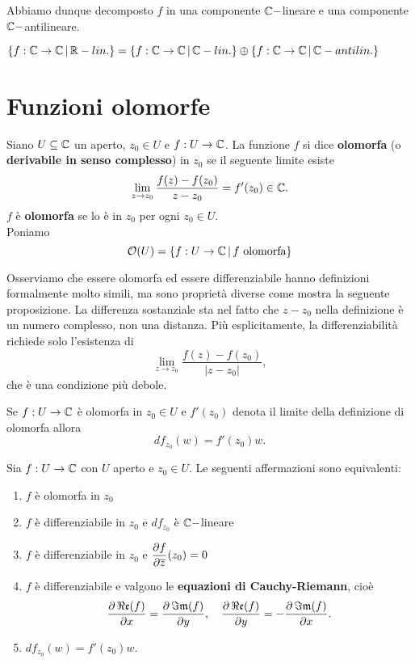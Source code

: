 \begin{multicols*}{2}
Abbiamo dunque decomposto $f$ in una componente $\C-$lineare e una componente $\C-$antilineare. \\
\begin{proposition}\label{RlinSonoSommaDirettaClinECantilin}

\footnotesize{$\cpa{f:\C\to \C\sep \R-lin.}=\cpa{f:\C\to \C\sep \C-lin.}\oplus\cpa{f:\C\to \C\sep \C-antilin.}$}
\end{proposition}

\section{Funzioni olomorfe}
\begin{definition}
Siano $U\subseteq \C$ un aperto, $z_0\in U$ e $f:U\to \C$. La funzione $f$ si dice \textbf{olomorfa} (o \textbf{derivabile in senso complesso}) in $z_0$ se il seguente limite esiste
\[\lim_{z\to z_0}\frac{f(z)-f(z_0)}{z-z_0}=f'(z_0)\in\C.\]
$f$ \`e \textbf{olomorfa} se lo \`e in $z_0$ per ogni $z_0\in U$.\\
Poniamo
\[\Oc(U)=\cpa{f:U\to\C\sep f\text{ olomorfa}}\]
\end{definition}
\noindent
Osserviamo che essere olomorfa ed essere differenziabile hanno definizioni formalmente molto simili, ma sono propriet\`a diverse come mostra la seguente proposizione. La differenza sostanziale sta nel fatto che $z-z_0$ nella definizione \`e un numero complesso, non una distanza. Pi\`u esplicitamente, la differenziabilit\`a richiede solo l'esistenza di \[\lim_{z\to z_0}\frac{f(z)-f(z_0)}{|z-z_0|},\] che \`e una condizione pi\`u debole.

\begin{lemma}
Se $f:U\to \C$ \`e olomorfa in $z_0\in U$ e $f'(z_0)$ denota il limite della definizione di olomorfa allora
\[df_{z_0}(w)=f'(z_0)w.\]
\end{lemma}

\begin{proposition}\label{CaratterizzazioneOlomorfaInPunto}
Sia $f:U\to \C$ con $U$ aperto e $z_0\in U$. Le seguenti affermazioni sono equivalenti:
\begin{enumerate}[noitemsep]
\item $f$ \`e olomorfa in $z_0$
\item $f$ \`e differenziabile in $z_0$ e $df_{z_0}$ \`e $\C-$lineare
\item $f$ \`e differenziabile in $z_0$ e $\displaystyle \pdp[\ol z]f(z_0)=0$
\item $f$ \`e differenziabile e valgono le \textbf{equazioni di Cauchy-Riemann}, cio\`e
\[\pdp[x]{\Real(f)}=\pdp[y]{\Imag(f)},\quad \pdp[y]{\Real(f)}=-\pdp[x]{\Imag(f)}.\]
\item $df_{z_0}(w)=f'(z_0)w$.
\end{enumerate}
\end{proposition}


\end{multicols*}
